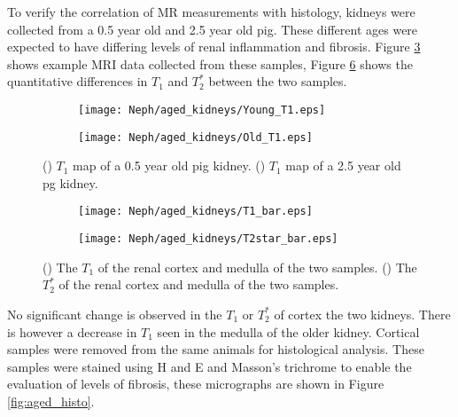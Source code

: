 To verify the correlation of MR measurements with histology, kidneys were collected from a 0.5 year old and 2.5 year old pig. These different ages were expected to have differing levels of renal inflammation and fibrosis. Figure \ref{fig:aged_map} shows example \ac{MRI} data collected from these samples, Figure \ref{fig:aged_bar} shows the quantitative differences in $T_1$ and $T_2^*$ between the two samples.

\begin{figure}[H]
	\centering
	\begin{subfigure}[c]{0.47\textwidth}
		\centering
		\texttt{[image: Neph/aged\_kidneys/Young\_T1.eps]}
		\caption{}
		\label{fig:neph_aged_t1_map}
	\end{subfigure}
	\hfill
	\begin{subfigure}[c]{0.47\textwidth}
		\centering
		\texttt{[image: Neph/aged\_kidneys/Old\_T1.eps]}
		\caption{}
		\label{fig:neph_aged_t2star_map}
	\end{subfigure}
	\caption{() $T_1$ map of a 0.5 year old pig kidney. () $T_1$ map of a 2.5 year old pg kidney.}
	\label{fig:aged_map}
\end{figure}

\begin{figure}[H]
	\centering
	\begin{subfigure}[c]{0.47\textwidth}
		\centering
		\texttt{[image: Neph/aged\_kidneys/T1\_bar.eps]}
		\caption{}
		\label{fig:neph_aged_t1_bar}
	\end{subfigure}
	\hfill
	\begin{subfigure}[c]{0.47\textwidth}
		\centering
		\texttt{[image: Neph/aged\_kidneys/T2star\_bar.eps]}
		\caption{}
		\label{fig:neph_aged_t2star_bar}
	\end{subfigure}
	\caption{() The $T_1$ of the renal cortex and medulla of the two samples. () The $T_2^*$ of the renal cortex and medulla of the two samples.}
	\label{fig:aged_bar}
\end{figure}

No significant change is observed in the $T_1$ or $T_2^*$ of cortex the two kidneys. There is however a decrease in $T_1$ seen in the medulla of the older kidney. Cortical samples were removed from the same animals for histological analysis. These samples were stained using \ac{H and E} and Masson's trichrome to enable the evaluation of levels of fibrosis, these micrographs are shown in Figure \ref{fig:aged_histo}. 

